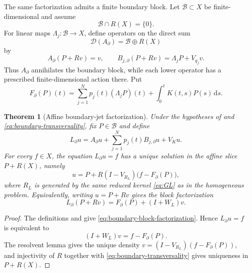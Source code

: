 \documentclass[11pt]{article}
\numberwithin{equation}{section}
\newtheorem{theorem}{Theorem}
\theoremstyle{definition}
\theoremstyle{remark}
\newcommand{\D}{\mathcal D}
\newcommand{\dd}{\,\mathrm d}
\begin{document}
The same factorization admits a finite boundary block. Let $\mathcal B\subset X$ be finite-dimensional and assume
\begin{equation}
\mathcal B\cap R(X)=\{0\}.
\label{eq:boundary-transversality}
\end{equation}
For linear maps $\Lambda_j:\mathcal B\to X$, define operators on the direct sum
\begin{equation*}
\D(A_\partial)=\mathcal B\oplus R(X)
\end{equation*}
by
\begin{equation}
A_\partial(P+Rv)=v,
\qquad
B_{j,\partial}(P+Rv)=\Lambda_jP+V_{q_j}v.
\label{eq:boundary-extended-operators}
\end{equation}
Thus $A_\partial$ annihilates the boundary block, while each lower operator has a prescribed finite-dimensional action there. Put
\begin{equation}
F_\partial(P)(t)
=\sum_{j=1}^{N}p_j(t)(\Lambda_jP)(t)
+\int_0^tK(t,s)P(s)\dd s.
\label{eq:boundary-forcing}
\end{equation}

\begin{theorem}[Affine boundary-jet factorization]\label{thm:boundary-factorization}
Under the hypotheses of  and \eqref{eq:boundary-transversality}, fix $P\in\mathcal B$ and define
\begin{equation*}
L_\partial u
=A_\partial u+\sum_{j=1}^{N}p_j(t)B_{j,\partial}u+V_Ku.
\end{equation*}
For every $f\in X$, the equation $L_\partial u=f$ has a unique solution in the affine slice $P+R(X)$, namely
\begin{equation}
u=P+R(I-V_{R_L})\bigl(f-F_\partial(P)\bigr),
\label{eq:boundary-solution}
\end{equation}
where $R_L$ is generated by the same reduced kernel \eqref{eq:GL} as in the homogeneous problem. Equivalently, writing $u=P+Rv$ gives the block factorization
\begin{equation}
L_\partial(P+Rv)=F_\partial(P)+(I+W_L)v.
\label{eq:boundary-block-factorization}
\end{equation}
\end{theorem}

\begin{proof}
The definitions and  give \eqref{eq:boundary-block-factorization}. Hence $L_\partial u=f$ is equivalent to
\begin{equation*}
(I+W_L)v=f-F_\partial(P).
\end{equation*}
The resolvent lemma gives the unique density $v=(I-V_{R_L})(f-F_\partial(P))$, and injectivity of $R$ together with \eqref{eq:boundary-transversality} gives uniqueness in $P+R(X)$.
\end{proof}
\end{document}

